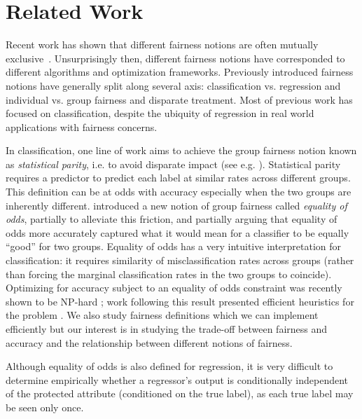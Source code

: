 \section{Related Work}
\label{sec:related}

Recent work has shown that different fairness notions are often
mutually
exclusive~\cite{KleinbergMR16,Chouldechova17,FriedlerSV16}. Unsurprisingly
then, different fairness notions have corresponded to different
algorithms and optimization frameworks.  Previously introduced
fairness notions have generally split along several axis:
classification vs. regression and individual vs. group fairness and
disparate treatment.  Most of previous work has focused on
classification, despite the ubiquity of regression in real world
applications with fairness concerns.

In classification, one line of work aims to achieve the group fairness
notion known as \emph{statistical parity}, i.e. to avoid disparate
impact (see e.g. \cite{PedreshiRT08, KamiranCP10, CaldersV10,
  KamiranC11, LuongRT11, KamiranKZ12, KamishimaAAS12, HajianD13,
  FeldmanFMSV15,FishKL16,AdlerFFRSSV16}).  Statistical parity requires
a predictor to predict each label at similar rates across different
groups.  This definition can be at odds with accuracy especially when
the two groups are inherently different.  \citet{HardtPS16} introduced
a new notion of group fairness called \emph{equality of odds},
partially to alleviate this friction, and partially arguing that
equality of odds more accurately captured what it would mean for a
classifier to be equally ``good'' for two groups. Equality of odds has
a very intuitive interpretation for classification: it requires
similarity of misclassification rates across groups (rather than
forcing the marginal classification rates in the two groups to
coincide). Optimizing for accuracy subject to an equality of odds
constraint was recently shown to be NP-hard \cite{WoodworthGOS17};
work following this result presented efficient heuristics for the
problem \cite{ZafarVGG17, WoodworthGOS17}. We also study
fairness definitions which we can implement efficiently but our interest is in studying
the trade-off between fairness and accuracy and the relationship between different notions
of fairness.

Although equality of odds is also defined for regression, it is very
difficult to determine empirically whether a regressor's output is
conditionally independent of the protected attribute (conditioned on
the true label), as each true label may be seen only once.


